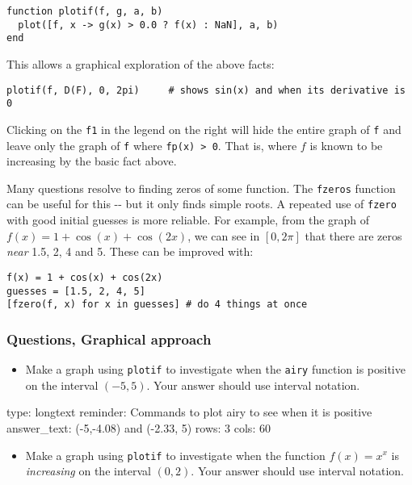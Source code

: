 \documentclass[12pt]{article}
\begin{document}
\begin{verbatim}
function plotif(f, g, a, b)
  plot([f, x -> g(x) > 0.0 ? f(x) : NaN], a, b)
end
\end{verbatim}
This allows a graphical exploration of the above facts:



\begin{verbatim}
plotif(f, D(F), 0, 2pi)     # shows sin(x) and when its derivative is 0
\end{verbatim}
Clicking on the \texttt{f1} in the legend on the right will hide the
entire graph of \texttt{f} and leave only the graph of \texttt{f} where
\texttt{fp(x) \textgreater{} 0}. That is, where $f$ is known to be
increasing by the basic fact above.



Many questions resolve to finding zeros of some function. The
\texttt{fzeros} function can be useful for this -{}- but it only finds
simple roots. A repeated use of \texttt{fzero} with good initial guesses
is more reliable. For example, from the graph of
$f(x) = 1 + \cos(x) + \cos(2x)$, we can see in $[0,2\pi]$ that there are
zeros \emph{near} 1.5, 2, 4 and 5. These can be improved with:



\begin{verbatim}
f(x) = 1 + cos(x) + cos(2x)
guesses = [1.5, 2, 4, 5]
[fzero(f, x) for x in guesses] # do 4 things at once
\end{verbatim}
\subsubsection{Questions, Graphical approach}

\begin{itemize}
\itemsep1pt\parskip0pt
\item
  Make a graph using \texttt{plotif} to investigate when the
  \texttt{airy} function is positive on the interval $(-5,5)$. Your
  answer should use interval notation.
\end{itemize}

\begin{answer}
type: longtext
reminder: Commands to plot airy to see when it is positive
answer_text: (-5,-4.08) and (-2.33, 5) 
rows: 3
cols: 60
\end{answer}

\begin{itemize}
\itemsep1pt\parskip0pt
\item
  Make a graph using \texttt{plotif} to investigate when the function
  $f(x) =   x^x$ is \emph{increasing} on the interval $(0,2)$. Your
  answer should use interval notation.
\end{itemize}
\end{document}
